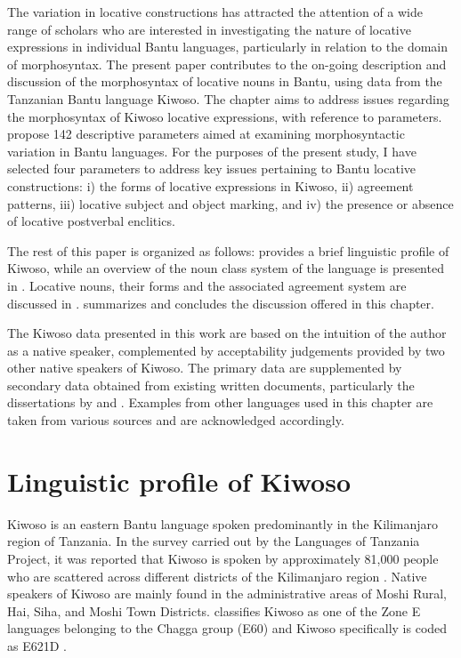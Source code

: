 \documentclass[output=paper]{langscibook}
\begin{document}
The variation in locative constructions has attracted the attention of a wide range of scholars who are interested in investigating the nature of locative expressions in individual Bantu languages, particularly in relation to the domain of morphosyntax. The present paper contributes to the on-going description and discussion of the morphosyntax of locative nouns in Bantu, using data from the Tanzanian Bantu language Kiwoso. The chapter aims to address issues regarding the morphosyntax of Kiwoso locative expressions, with reference to  parameters. \citet{GuéroisEtAl2017} propose 142 descriptive parameters aimed at examining morphosyntactic variation in Bantu languages. For the purposes of the present study, I have selected four parameters to address key issues pertaining to Bantu locative constructions: i) the forms of locative expressions in Kiwoso, ii) agreement patterns, iii) locative subject and object marking, and iv) the presence or absence of locative postverbal enclitics. 

The rest of this paper is organized as follows:  provides a brief linguistic profile of Kiwoso, while an overview of the noun class system of the language is presented in . Locative nouns, their forms and the associated agreement system are discussed in .  summarizes and concludes the discussion offered in this chapter.

The Kiwoso data presented in this work are based on the intuition of the author as a native speaker, complemented by acceptability judgements provided by two other native speakers of Kiwoso. The primary data are supplemented by secondary data obtained from existing written documents, particularly the dissertations by \citet{Mallya2011, Mallya2016} and \citet{Mushi2005}. Examples from other languages used in this chapter are taken from various sources and are acknowledged accordingly.


\section{Linguistic profile of Kiwoso}
\label{sec:mallya:2}

Kiwoso is an eastern Bantu language spoken predominantly in the Kilimanjaro region of Tanzania. In the survey carried out by the Languages of Tanzania Project, it was reported that Kiwoso is spoken by approximately 81,000 people who are scattered across different districts of the Kilimanjaro region \citep{LanguagesofTanzaniaProject2009}. Native speakers of Kiwoso are mainly found in the administrative areas of Moshi Rural, Hai, Siha, and Moshi Town Districts. \citet{Maho2009} classifies Kiwoso as one of the Zone E languages belonging to the Chagga group (E60) and Kiwoso specifically is coded as E621D \citep{Maho2009}.
\end{document}
